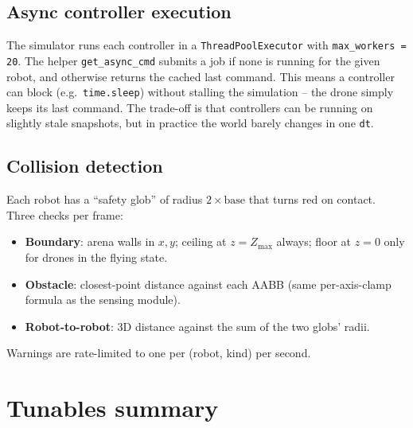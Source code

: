 \documentclass[11pt,a4paper]{article}
\newcommand{\code}[1]{\texttt{#1}}
\begin{document}
\subsection{Async controller execution}
The simulator runs each controller in a \code{ThreadPoolExecutor} with
\code{max\_workers = 20}. The helper \code{get\_async\_cmd} submits a job if
none is running for the given robot, and otherwise returns the cached last
command. This means a controller can block (e.g.\ \code{time.sleep}) without
stalling the simulation -- the drone simply keeps its last command. The
trade-off is that controllers can be running on slightly stale snapshots, but
in practice the world barely changes in one \code{dt}.

\subsection{Collision detection}
Each robot has a ``safety glob'' of radius $2 \times \text{base}$ that turns
red on contact. Three checks per frame:
\begin{itemize}[leftmargin=1.4em]
  \item \textbf{Boundary}: arena walls in $x, y$; ceiling at $z = Z_{\max}$
        always; floor at $z = 0$ only for drones in the flying state.
  \item \textbf{Obstacle}: closest-point distance against each AABB (same
        per-axis-clamp formula as the sensing module).
  \item \textbf{Robot-to-robot}: 3D distance against the sum of the two
        globs' radii.
\end{itemize}
Warnings are rate-limited to one per (robot, kind) per second.

\section{Tunables summary}
\end{document}
